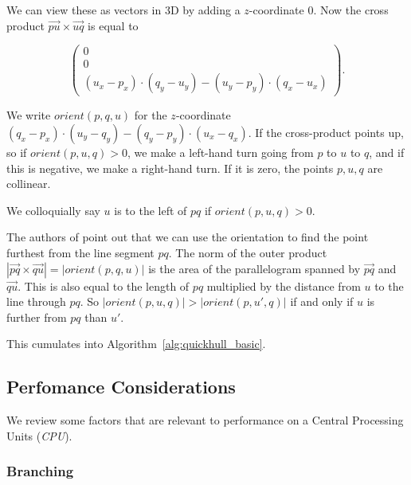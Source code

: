 We can view these as vectors in 3D by adding a $z$-coordinate $0$. Now the
cross product $\vec{pu} \times \vec{uq}$ is equal to 

\[
    \begin{pmatrix}
        0 \\
        0 \\
        (u_x - p_x) \cdot (q_y - u_y) - (u_y - p_y) \cdot (q_x - u_x)
    \end{pmatrix}.
\]

We write $orient(p, q, u)$ for the $z$-coordinate
$(q_x - p_x) \cdot (u_y - q_y) - (q_y - p_y) \cdot (u_x - q_x)$. 
If the cross-product points up, so if $orient(p, u, q) > 0$, we make a left-hand 
turn going from $p$ to $u$ to $q$, and if this is negative, we make a right-hand
turn. If it is zero, the points $p, u, q$ are collinear. 

We colloquially say $u$ is to the left of $pq$ if $orient(p, u, q) > 0$.

The authors of \cite{quickerthanqhull} point out that we can use the 
orientation to find the point furthest from the line segment $pq$. 
The norm of the outer product
$|\vec{pq} \times \vec{qu}| = |orient(p, q, u)|$ is the area of the
parallelogram spanned by $\vec{pq}$ and $\vec{qu}$. This is also equal to
the length of $pq$ multiplied by the distance from $u$ to the line through 
$pq$. So $|orient(p, u, q)| > |orient(p, u', q)|$ if and only if $u$ is further
from $pq$ than $u'$.

This cumulates into Algorithm~\ref{alg:quickhull_basic}. 

\subsection{Perfomance Considerations}

We review some factors that are relevant to performance on a Central Processing
Units (\textit{CPU}).

\subsubsection{Branching}

